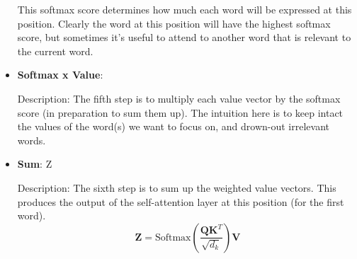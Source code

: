 \documentclass{article}
\begin{document}
\begin{itemize}
This softmax score determines how much each word will be expressed at this position. Clearly the word at this position will have the highest softmax score, but sometimes it’s useful to attend to another word that is relevant to the current word.

\item \textbf{Softmax x Value}:

Description: The fifth step is to multiply each value vector by the softmax score (in preparation to sum them up). The intuition here is to keep intact the values of the word(s) we want to focus on, and drown-out irrelevant words.

\item \textbf{Sum}: Z

Description: The sixth step is to sum up the weighted value vectors. This produces the output of the self-attention layer at this position (for the first word).
\[  \mathbf{Z} = \text{Softmax}\left(\frac{\mathbf{Q} \mathbf{K}^T}{\sqrt{d_k}}\right) \mathbf{V} \]
\end{itemize}
\end{document}
